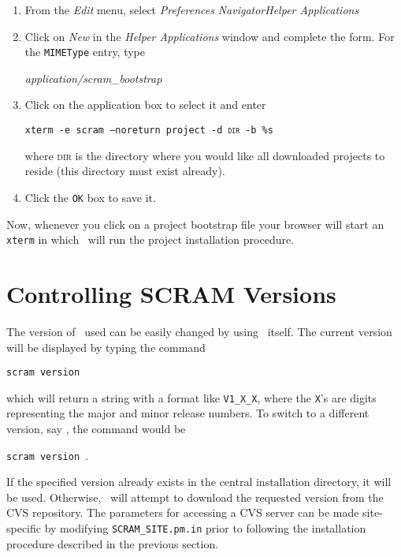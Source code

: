 \begin{enumerate}
\item From the \textit{Edit} menu, select
  \textit{Preferences}\mylongrightarrow
  \textit{Navigator}\mylongrightarrow\textit{Helper Applications}
  
\item Click on \textit{New} in the \textit{Helper Applications} window and
  complete the form. For the \texttt{MIMEType} entry, type\mbox{}
  
  \textit{application/scram\_bootstrap}
  
\item Click on the application box to select it and enter
  
  \texttt{xterm -e scram --noreturn project -d \textsc{dir} -b \%s}
  
  where \textsc{dir} is the directory where you would like all
  downloaded projects to reside (this directory must exist already).
  
\item Click the \texttt{OK} box to save it.
\end{enumerate}

\ni Now, whenever you click on a project bootstrap file your browser
will start an \texttt{xterm} in which \scram\ will run the project
installation procedure.

\section{Controlling SCRAM Versions}
The version of \scram\ used can be easily changed by using \scram\
itself. The current version will be displayed by typing the command

\texttt{scram version}
 
\ni which will return a string with a format like \texttt{V1\_X\_X},
where the \texttt{X}'s are digits representing the major and minor
release numbers.  To switch to a different version, say \lastrelease, the
command would be\mbox{}

\texttt{scram version \lastrelease}.

\ni If the specified version already exists in the central
installation directory, it will be used. Otherwise, \scram\ will
attempt to download the requested version from the CVS repository.
The parameters for accessing a CVS server can be made site-specific by
modifying \texttt{SCRAM\_SITE.pm.in} prior to following the
installation procedure described in the previous section.

